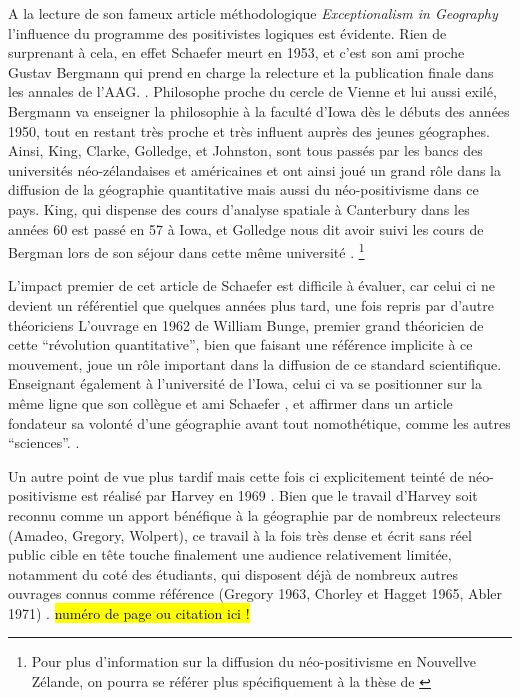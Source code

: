 A la lecture de son fameux article méthodologique \textit{Exceptionalism in Geography} l'influence du programme des positivistes logiques est évidente. Rien de surprenant à cela, en effet Schaefer meurt en 1953, et c'est son ami proche Gustav Bergmann qui prend en charge la relecture et la publication finale dans les annales de l'AAG. \autocite[32]{Gregory1978}. Philosophe proche du cercle de Vienne et lui aussi exilé, Bergmann va enseigner la philosophie à la faculté d'Iowa dès le débuts des années 1950, tout en restant très proche et très influent auprès des jeunes géographes.\autocite[192]{Buttimer1983} Ainsi, King, Clarke, Golledge, et Johnston, sont tous passés par les bancs des universités néo-zélandaises et américaines et ont ainsi joué un grand rôle dans la diffusion de la géographie quantitative mais aussi du néo-positivisme dans ce pays. King, qui dispense des cours d'analyse spatiale à Canterbury dans les années 60 est passé en 57 à Iowa, et Golledge nous dit avoir suivi les cours de Bergman lors de son séjour dans cette même université \autocite[95-96]{Bailly2000}. \footnote{Pour plus d'information sur la diffusion du néo-positivisme en Nouvellve Zélande, on pourra se référer plus spécifiquement à la thèse de \textcite{Hammond1992}}

L'impact premier de cet article de Schaefer est difficile à évaluer, car celui ci ne devient un référentiel que quelques années plus tard, une fois repris par d'autre théoriciens \autocite[32]{Gregory1978} L'ouvrage en 1962 de William Bunge, premier grand théoricien de cette \enquote{révolution quantitative}, bien que faisant une référence implicite à ce mouvement, joue un rôle important dans la diffusion de ce standard scientifique. Enseignant également à l'université de l'Iowa, celui ci va se positionner sur la même ligne que son collègue et ami Schaefer \autocite{Goodchild2001}, et affirmer dans un article fondateur \autocite{Bunge1962} sa volonté d'une géographie avant tout nomothétique, comme les autres \enquote{sciences}. \autocite{Bunge1979} \autocite{Claval2003} \autocite[429-430]{Gregory2009}.

Un autre point de vue plus tardif mais cette fois ci explicitement teinté de néo-positivisme est réalisé par Harvey en 1969 \autocite{Harvey1969}. Bien que le travail d'Harvey soit reconnu comme un apport bénéfique à la géographie par de nombreux relecteurs (Amadeo, Gregory, Wolpert), ce travail à la fois très dense et écrit sans réel public cible en tête touche finalement une audience relativement limitée, notamment du coté des étudiants, qui disposent déjà de nombreux autres ouvrages connus comme référence (Gregory 1963, Chorley et Hagget 1965, Abler 1971) \autocite{Johnston2008}. \hl{numéro de page ou citation ici !}

